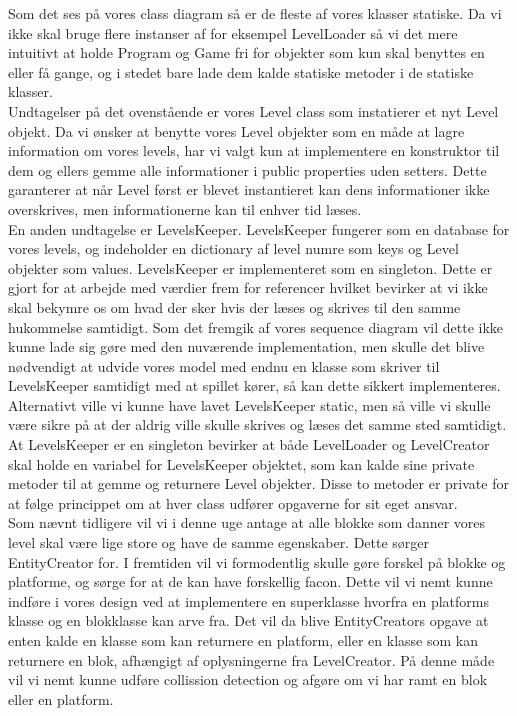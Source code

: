 Som det ses på vores class diagram så er de fleste af vores klasser statiske. Da vi ikke skal bruge flere instanser af for eksempel LevelLoader så vi det mere intuitivt at holde Program og Game fri for objekter som kun skal benyttes en eller få gange, og i stedet bare lade dem kalde statiske metoder i de statiske klasser.\\
Undtagelser på det ovenstående er vores Level class som instatierer et nyt Level objekt. Da vi ønsker at benytte vores Level objekter som en måde at lagre information om vores levels, har vi valgt kun at implementere en konstruktor til dem og ellers gemme alle informationer i public properties uden setters. Dette garanterer at når Level først er blevet instantieret kan dens informationer ikke overskrives, men informationerne kan til enhver tid læses.\\
En anden undtagelse er LevelsKeeper. LevelsKeeper fungerer som en database for vores levels, og indeholder en dictionary af level numre som keys og Level objekter som values. LevelsKeeper er implementeret som en singleton. Dette er gjort for at arbejde med værdier frem for referencer hvilket bevirker at vi ikke skal bekymre os om hvad der sker hvis der læses og skrives til den samme hukommelse samtidigt. Som det fremgik af vores sequence diagram vil dette ikke kunne lade sig gøre med den nuværende implementation, men skulle det blive nødvendigt at udvide vores model med endnu en klasse som skriver til LevelsKeeper samtidigt med at spillet kører, så kan dette sikkert implementeres. Alternativt ville vi kunne have lavet LevelsKeeper static, men så ville vi skulle være sikre på at der aldrig ville skulle skrives og læses det samme sted samtidigt.\\
At LevelsKeeper er en singleton bevirker at både LevelLoader og LevelCreator skal holde en variabel for LevelsKeeper objektet, som kan kalde sine private metoder til at gemme og returnere Level objekter. Disse to metoder er private for at følge princippet om at hver class udfører opgaverne for sit eget ansvar.\\

Som nævnt tidligere vil vi i denne uge antage at alle blokke som danner vores level skal være lige store og have de samme egenskaber. Dette sørger EntityCreator for. I fremtiden vil vi formodentlig skulle gøre forskel på blokke og platforme, og sørge for at de kan have forskellig facon. Dette vil vi nemt kunne indføre i vores design ved at implementere en superklasse hvorfra en platforms klasse og en blokklasse kan arve fra. Det vil da blive EntityCreators opgave at enten kalde en klasse som kan returnere en platform, eller en klasse som kan returnere en blok, afhængigt af oplysningerne fra LevelCreator. På denne måde vil vi nemt kunne udføre collission detection og afgøre om vi har ramt en blok eller en platform.
